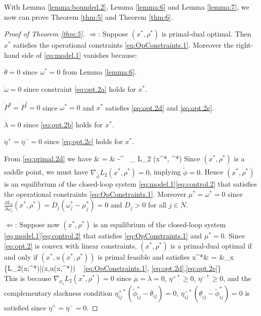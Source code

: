 With Lemma \ref{lemma:bounded.2}, Lemma \ref{lemma:6}
and Lemma \ref{lemma:7}, we now can prove Theorem \ref{thm:5} and Theorem \ref{thm:6}.
\begin{proof}[Proof of Theorem \ref{thm:5}]
	\noindent
	$\Rightarrow$: 
	Suppose $(x^*, \rho^*)$ is primal-dual optimal. 
	Then $x^*$ satisfies the operational constraints \eqref{eq:OpConstraints.1}.
	Moreover the right-hand side of \eqref{eq:model.1} vanishes because:
	\bi
	\item $\dot\theta = 0$ since $\omega^*=0$ from Lemma \ref{lemma:6}.
	\item $\dot\omega = 0$ since constraint \eqref{eq:opt.2a} holds for $x^*$.
	\item $\dot P^g =\dot P^l=0$ since $\omega^*= 0$ and $x^*$ 
	satisfies \eqref{eq:opt.2d} and \eqref{eq:opt.2e}.
	\item $\dot \lambda = 0$ since \eqref{eq:opt.2b} holds for $x^*$.
	\item $\dot \eta^+ = \dot \eta^- = 0$ since \eqref{eq:opt.2c} holds for $x^*$.
	\item From \eqref{eq:primal.2d} we have 
		\bqn
		\dot {\tilde{\phi}} & = & -\Gamma^{\tilde{\phi}} \ \nabla_{\tilde{\phi}} L_2 (x^*, \rho^*)
		\eqn
		Since $(x^*, \rho^*)$ is a saddle point,
		we must have $\nabla_{\tilde{\phi}} L_2 (x^*, \rho^*)=0$, implying
		$\dot {\tilde{\phi}}=0$.
	\ei 
	Hence $(x^*, \rho^*)$ is an equilibrium of the closed-loop system 
	\eqref{eq:model.1}\eqref{eq:control.2} that satisfies 
	the operational constraints \eqref{eq:OpConstraints.1}.   Moreover 
	$\mu^* = \omega^* = 0$ since
	$
	\frac{\partial L_2}{\partial \omega_j}(x^*, \rho^*)  = 
	D_j ( \omega^*_j - \mu^*_j) = 0
	$
	and $D_j>0$ for all $j\in N$.
	
	
	\vspace{0.07in}
	\noindent
	$\Leftarrow$: Suppose now $(x^*, \rho^*)$ is an equilibrium of the closed-loop 
	system \eqref{eq:model.1}\eqref{eq:control.2} that satisfies \eqref{eq:OpConstraints.1}
	and $\mu^*=0$.
	Since \eqref{eq:opt.2} is convex with linear constraints, 
	$(x^*, \rho^*)$ is a primal-dual optimal if and only if 
	$(x^*, u(x^*, \rho^*))$ is primal feasible and satisfies 
	\bq
	x^*& \!\!\!\!\!\!\!\! = \!\!\!\!\!\!\!\! &\arg \min_x \{L_2(x;\rho^*)|(x,u(x,\rho^*))
	\  \eqref{eq:OpConstraints.1},
	\eqref{eq:opt.2d},\eqref{eq:opt.2e}\}\nonumber\\  
	\label{eq:lamma.7}
	\eq
	This is because $\nabla_{\rho_1} L_2(x^*, \rho^*)=0$ since
	$\dot\mu = \dot\lambda = 0$, $\eta^{+*}\geq 0$, $\eta^{-*}\geq 0$,
	 and the complementary slackness condition
	$\eta^{+*}_{ij}(\tilde\phi_{ij}^*-\overline{\theta}_{ij})=0$,
	$\eta^{-*}_{ij}(\underline{\theta}_{ij}-\tilde\phi_{ij}^*)=0$ is satisfied
	since $\dot{\eta}^+ = \dot{\eta}^- =0$.
	

\end{proof}
